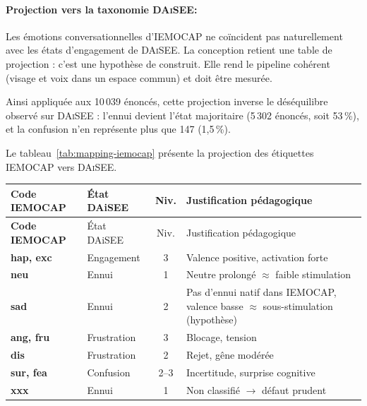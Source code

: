 \paragraph{Projection vers la taxonomie \textsc{DAiSEE}:}
\label{subsec:mapping-iemocap}
\label{subsec:sensibilite-mapping}

Les émotions conversationnelles d'\textsc{IEMOCAP} ne coïncident pas
naturellement avec les états d'engagement de \textsc{DAiSEE}. La conception
retient une table de projection : c'est une hypothèse de
construit. Elle rend le
pipeline cohérent (visage et voix dans un espace commun) et doit être
mesurée.

Ainsi appliquée aux 10\,039 énoncés, cette projection inverse le
déséquilibre observé sur \textsc{DAiSEE} : l'ennui devient l'état
majoritaire (5\,302 énoncés, soit 53\,\%), et la confusion n'en
représente plus que 147 (1{,}5\,\%).

Le tableau~\ref{tab:mapping-iemocap} présente la projection des étiquettes \textsc{IEMOCAP} vers \textsc{DAiSEE}.

{\small
\renewcommand{\arraystretch}{1.18}
\setlength{\tabcolsep}{4pt}
\begin{xltabular}{\textwidth}{|>{\bfseries}l|l|c|X|}
\hline
{}
Code IEMOCAP & État DAiSEE & Niv. & Justification pédagogique \\
\hline
\endfirsthead
\hline
{}
Code IEMOCAP & État DAiSEE & Niv. & Justification pédagogique \\
\hline
\endhead
\endfoot
\endlastfoot
hap, exc & Engagement  & 3 & Valence positive, activation forte \\
\hline
neu      & Ennui     & 1 & Neutre prolongé $\approx$ faible stimulation \\
\hline
sad      & Ennui     & 2 & Pas d'ennui natif dans IEMOCAP, valence basse $\approx$ sous-stimulation (hypothèse) \\
\hline
ang, fru & Frustration & 3 & Blocage, tension \\
\hline
dis      & Frustration & 2 & Rejet, gêne modérée \\
\hline
sur, fea & Confusion   & 2--3 & Incertitude, surprise cognitive \\
\hline
xxx      & Ennui     & 1 & Non classifié $\rightarrow$ défaut prudent \\
\hline
\end{xltabular}
\label{tab:mapping-iemocap}
}

